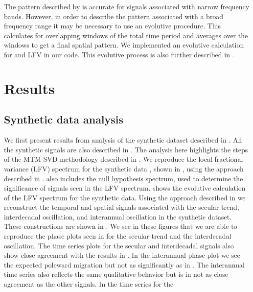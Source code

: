 \documentclass[phd,tocprelim]{cornell}
\begin{document}
The pattern described by  is accurate for signals 
associated with narrow frequency bands. However, in order to 
describe the pattern associated with a broad frequency range it may 
be necessary to use an evolutive procedure. This calculates  
for overlapping windows of the total time period and averages over 
the windows to get a final spatial pattern. We implemented an 
evolutive calculation for  and LFV in our code. This 
evolutive process is also further described in \cite{mann1999oscillatory}.

\section{Results}\label{results:2}

\subsection{Synthetic data analysis}\label{anal:synth}
We first present results from analysis of the synthetic dataset 
described in . All the synthetic signals are also 
described in . The analysis here highlights the steps 
of the MTM-SVD methodology described in . We reproduce the
local fractional variance (LFV) spectrum for the synthetic data 
\cite{mann1999oscillatory}, shown in , using
the approach described in .  also 
includes the null hypothesis spectrum, used to determine the significance 
of signals seen in the LFV spectrum.  shows the 
evolutive calculation of the LFV spectrum for the synthetic data. 
Using the approach described in  we reconstruct the 
temporal and spatial signals associated with the secular trend, 
interdecadal oscillation, and 
interannual oscillation in the synthetic dataset. 
These constructions are shown in 
. 
We see in these figures that we are able to reproduce the 
phase plots seen in \cite{mann1999oscillatory} for the secular 
trend and the interdecadal oscillation. The time series plots for the 
secular and interdecadal signals also show close agreement with the 
results in \cite{mann1999oscillatory}. In the interannual phase plot 
we see the expected poleward migration but not as significantly as in 
\cite{mann1999oscillatory}. The interannual time series also reflects 
the same qualitative behavior but is in not as close agreement as the 
other signals. In \cite{mann1999oscillatory} the time series for the 
\end{document}
